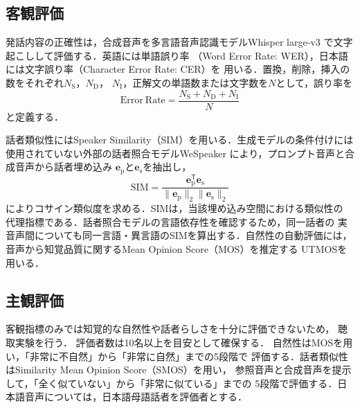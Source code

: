 \documentclass[twocolumn, a4paper]{UECIEresume}
\begin{document}
\subsection{客観評価}

発話内容の正確性は，合成音声を多言語音声認識モデルWhisper large-v3
\cite{Radford2023Whisper,OpenAI2023WhisperLargeV3}で文字起こしして評価する．英語には単語誤り率
（Word Error Rate: WER），日本語には文字誤り率（Character Error Rate: CER）を
用いる．置換，削除，挿入の数をそれぞれ$N_{\mathrm{S}}$，$N_{\mathrm{D}}$，
$N_{\mathrm{I}}$，正解文の単語数または文字数を$N$として，誤り率を
\begin{equation*}
  \mathrm{Error\ Rate}
  = \frac{N_{\mathrm{S}}+N_{\mathrm{D}}+N_{\mathrm{I}}}{N}
\end{equation*}
と定義する．

話者類似性にはSpeaker Similarity（SIM）を用いる．生成モデルの条件付けには
使用されていない外部の話者照合モデルWeSpeaker
\cite{Wang2023WeSpeaker}により，プロンプト音声と合成音声から話者埋め込み
$\boldsymbol{e}_{\mathrm{p}}$と$\boldsymbol{e}_{\mathrm{s}}$を抽出し，
\begin{equation*}
  \mathrm{SIM}
  = \frac{\boldsymbol{e}_{\mathrm{p}}^{\mathsf{T}}
  \boldsymbol{e}_{\mathrm{s}}}
  {\lVert\boldsymbol{e}_{\mathrm{p}}\rVert_2
  \lVert\boldsymbol{e}_{\mathrm{s}}\rVert_2}
\end{equation*}
によりコサイン類似度を求める．SIMは，当該埋め込み空間における類似性の
代理指標である．話者照合モデルの言語依存性を確認するため，同一話者の
実音声間についても同一言語・異言語のSIMを算出する．自然性の自動評価には，
音声から知覚品質に関するMean Opinion Score（MOS）を推定する
UTMOS\cite{Saeki2022UTMOS}を用いる．

\subsection{主観評価}

客観指標のみでは知覚的な自然性や話者らしさを十分に評価できないため，
聴取実験を行う．
評価者数は10名以上を目安として確保する．
自然性はMOSを用い，「非常に不自然」から「非常に自然」までの5段階で
評価する．話者類似性はSimilarity Mean Opinion Score（SMOS）を用い，
参照音声と合成音声を提示して，「全く似ていない」から「非常に似ている」までの
5段階で評価する．日本語音声については，日本語母語話者を評価者とする．
\end{document}
